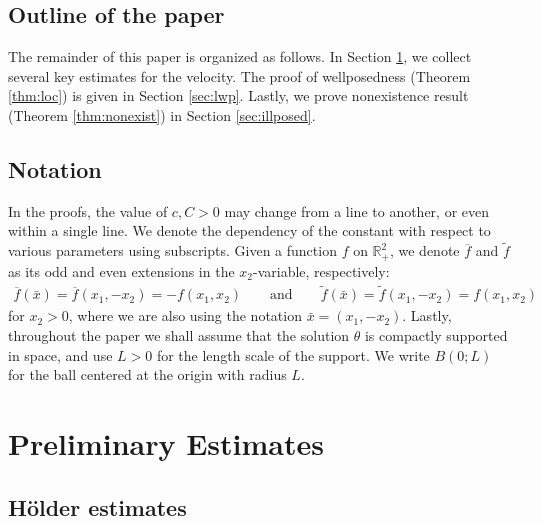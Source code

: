 \documentclass[10pt]{amsart}
\theoremstyle{definition}
\theoremstyle{remark}
\numberwithin{equation}{section}
\newcommand{\0}{\emptyset}
\newcommand{\tht}{\theta}
\newcommand{\bbR}{\mathbb R}
\begin{document}
	
	\subsection{Outline of the paper}
	
	The remainder of this paper is organized as follows. In Section \ref{sec:key}, we collect several key estimates for the velocity. The proof of wellposedness (Theorem \ref{thm:loc}) is given in Section \ref{sec:lwp}. Lastly, we prove nonexistence result (Theorem \ref{thm:nonexist}) in Section \ref{sec:illposed}.  
	
	
	\subsection{Notation} In the proofs, the value of $c, C>0$ may change from a line to another, or even within a single line. We denote the dependency of the constant with respect to various parameters using subscripts. Given a function $f$ on $\bbR^2_+$, we denote $\overline{f}$ and $\widetilde{f}$ as its odd and even extensions in the $x_2$-variable, respectively: \begin{equation*}
		\begin{split}
			\overline{f}(\bar{x}) = \overline{f}(x_1,-x_2) = -f(x_1,x_2) \qquad \mbox{and} \qquad \widetilde{f}(\bar{x}) = \widetilde{f}(x_1,-x_2) = f(x_1,x_2)
		\end{split}
	\end{equation*}for $x_{2}>0$, where we are also using the notation $\bar{x} = (x_{1}, -x_{2})$. Lastly, throughout the paper we shall assume that the solution $\tht$ is compactly supported in space, and use $L>0$ for the length scale of the support. We write $B(0;L)$ for the ball centered at the origin with radius $L$. 
	
	
	
	
	
	\section{Preliminary Estimates}\label{sec:key}
	
	\subsection{H\"older estimates}
	
\end{document}
